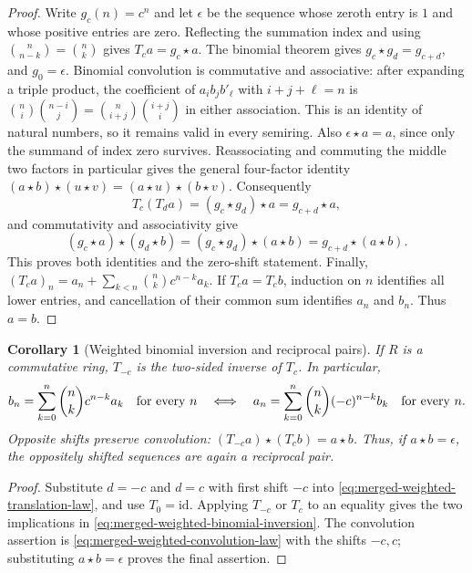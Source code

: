 \documentclass[11pt,a4paper,oneside,openany]{book}
\newtheorem{corollary}[theorem]{Corollary}
\theoremstyle{definition}
\theoremstyle{remark}
\begin{document}
\begin{proof}
Write $g_c(n)=c^n$ and let $\epsilon$ be the sequence whose zeroth entry is
$1$ and whose positive entries are zero.  Reflecting the summation index and
using $\binom n{n-k}=\binom nk$ gives $T_ca=g_c\star a$.
The binomial theorem gives $g_c\star g_d=g_{c+d}$, and $g_0=\epsilon$.
Binomial convolution is commutative and associative: after expanding a triple
product, the coefficient of $a_ib_jb'_{\ell}$ with $i+j+\ell=n$ is
$\binom ni\binom{n-i}j=\binom n{i+j}\binom{i+j}i$ in either association.
This is an identity of natural numbers, so it remains valid in every semiring.
Also $\epsilon\star a=a$, since only the summand of index zero survives.
Reassociating and commuting the middle two factors in particular gives the
general four-factor identity
$(a\star b)\star(u\star v)=(a\star u)\star(b\star v)$.
Consequently
\[
 T_c(T_da)=(g_c\star g_d)\star a=g_{c+d}\star a,
\]
and commutativity and associativity give
\[
 (g_c\star a)\star(g_d\star b)
   =(g_c\star g_d)\star(a\star b)
   =g_{c+d}\star(a\star b).
\]
This proves both identities and the zero-shift statement.  Finally,
$(T_ca)_n=a_n+\sum_{k<n}\binom nk c^{n-k}a_k$.
If $T_ca=T_cb$, induction on $n$ identifies all lower entries, and cancellation
of their common sum identifies $a_n$ and $b_n$.  Thus $a=b$.
\end{proof}

\begin{corollary}[Weighted binomial inversion and reciprocal pairs]
\label{cor:merged-weighted-binomial-inversion}
If $R$ is a commutative ring, $T_{-c}$ is the two-sided inverse of $T_c$.
In particular,
\begin{equation}
 b_n=\sum_{k=0}^n\binom nk c^{n-k}a_k\quad\hbox{for every }n
 \quad\Longleftrightarrow\quad
 a_n=\sum_{k=0}^n\binom nk(-c)^{n-k}b_k\quad\hbox{for every }n.   \label{eq:merged-weighted-binomial-inversion}
\end{equation}
Opposite shifts preserve convolution:
$(T_{-c}a)\star(T_cb)=a\star b$.  Thus, if $a\star b=\epsilon$,
the oppositely shifted sequences are again a reciprocal pair.
\end{corollary}

\begin{proof}
Substitute $d=-c$ and $d=c$ with first shift $-c$ into
\cref{eq:merged-weighted-translation-law}, and use $T_0=\mathrm{id}$.
Applying $T_{-c}$ or $T_c$ to an equality gives the two implications in
\cref{eq:merged-weighted-binomial-inversion}.
The convolution assertion is \cref{eq:merged-weighted-convolution-law} with
the shifts $-c,c$; substituting $a\star b=\epsilon$ proves the final assertion.
\end{proof}
\end{document}
